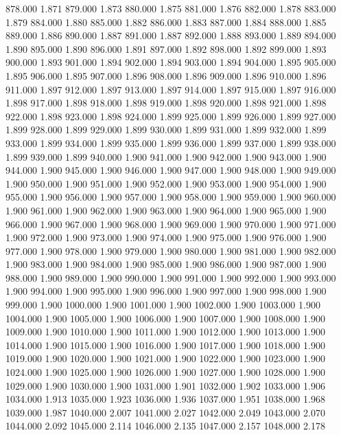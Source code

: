 878.000 1.871 
879.000 1.873 
880.000 1.875 
881.000 1.876 
882.000 1.878 
883.000 1.879 
884.000 1.880 
885.000 1.882 
886.000 1.883 
887.000 1.884 
888.000 1.885 
889.000 1.886 
890.000 1.887 
891.000 1.887 
892.000 1.888 
893.000 1.889 
894.000 1.890 
895.000 1.890 
896.000 1.891 
897.000 1.892 
898.000 1.892 
899.000 1.893 
900.000 1.893 
901.000 1.894 
902.000 1.894 
903.000 1.894 
904.000 1.895 
905.000 1.895 
906.000 1.895 
907.000 1.896 
908.000 1.896 
909.000 1.896 
910.000 1.896 
911.000 1.897 
912.000 1.897 
913.000 1.897 
914.000 1.897 
915.000 1.897 
916.000 1.898 
917.000 1.898 
918.000 1.898 
919.000 1.898 
920.000 1.898 
921.000 1.898 
922.000 1.898 
923.000 1.898 
924.000 1.899 
925.000 1.899 
926.000 1.899 
927.000 1.899 
928.000 1.899 
929.000 1.899 
930.000 1.899 
931.000 1.899 
932.000 1.899 
933.000 1.899 
934.000 1.899 
935.000 1.899 
936.000 1.899 
937.000 1.899 
938.000 1.899 
939.000 1.899 
940.000 1.900 
941.000 1.900 
942.000 1.900 
943.000 1.900 
944.000 1.900 
945.000 1.900 
946.000 1.900 
947.000 1.900 
948.000 1.900 
949.000 1.900 
950.000 1.900 
951.000 1.900 
952.000 1.900 
953.000 1.900 
954.000 1.900 
955.000 1.900 
956.000 1.900 
957.000 1.900 
958.000 1.900 
959.000 1.900 
960.000 1.900 
961.000 1.900 
962.000 1.900 
963.000 1.900 
964.000 1.900 
965.000 1.900 
966.000 1.900 
967.000 1.900 
968.000 1.900 
969.000 1.900 
970.000 1.900 
971.000 1.900 
972.000 1.900 
973.000 1.900 
974.000 1.900 
975.000 1.900 
976.000 1.900 
977.000 1.900 
978.000 1.900 
979.000 1.900 
980.000 1.900 
981.000 1.900 
982.000 1.900 
983.000 1.900 
984.000 1.900 
985.000 1.900 
986.000 1.900 
987.000 1.900 
988.000 1.900 
989.000 1.900 
990.000 1.900 
991.000 1.900 
992.000 1.900 
993.000 1.900 
994.000 1.900 
995.000 1.900 
996.000 1.900 
997.000 1.900 
998.000 1.900 
999.000 1.900 
1000.000 1.900 
1001.000 1.900 
1002.000 1.900 
1003.000 1.900 
1004.000 1.900 
1005.000 1.900 
1006.000 1.900 
1007.000 1.900 
1008.000 1.900 
1009.000 1.900 
1010.000 1.900 
1011.000 1.900 
1012.000 1.900 
1013.000 1.900 
1014.000 1.900 
1015.000 1.900 
1016.000 1.900 
1017.000 1.900 
1018.000 1.900 
1019.000 1.900 
1020.000 1.900 
1021.000 1.900 
1022.000 1.900 
1023.000 1.900 
1024.000 1.900 
1025.000 1.900 
1026.000 1.900 
1027.000 1.900 
1028.000 1.900 
1029.000 1.900 
1030.000 1.900 
1031.000 1.901 
1032.000 1.902 
1033.000 1.906 
1034.000 1.913 
1035.000 1.923 
1036.000 1.936 
1037.000 1.951 
1038.000 1.968 
1039.000 1.987 
1040.000 2.007 
1041.000 2.027 
1042.000 2.049 
1043.000 2.070 
1044.000 2.092 
1045.000 2.114 
1046.000 2.135 
1047.000 2.157 
1048.000 2.178 
